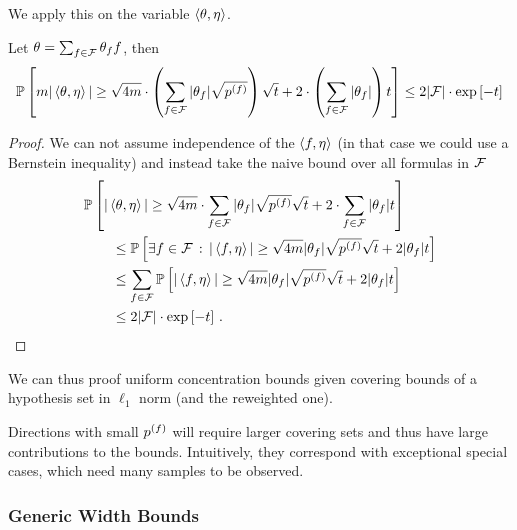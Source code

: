 We apply this on the variable  $\braket{\theta,\eta}$.

\begin{theorem}
	Let $\theta = \sum_{f\in\mathcal{F}} \theta_{f}f$, then
	\[ \mathbb{P}\left[m |\braket{\theta,\eta}|\geq \sqrt{4 m} \cdot \left( \sum_{f\in\mathcal{F}} |\theta_{f}| \sqrt{p^{(f)}} \right) \sqrt{t}  + 2 \cdot \left( \sum_{f\in\mathcal{F}} |\theta_{f}|  \right) t \right] \leq 2|\mathcal{F} | \cdot \mathrm{exp}\left[- t\right] \]
\end{theorem}
\begin{proof}
	We can not assume independence of the $\braket{f,\eta}$ (in that case we could use a Bernstein inequality) and instead take the naive bound over all formulas in $\mathcal{F}$ 
	\begin{align}
		& \mathbb{P}\left[|\braket{\theta,\eta}|\geq
		 \sqrt{4 m} \cdot \sum_{f\in\mathcal{F}} |\theta_{f}| \sqrt{p^{(f)}}\sqrt{t}  
		 + 2 \cdot \sum_{f\in\mathcal{F}} |\theta_{f}|  t \right] \\
		& \quad \quad \leq \mathbb{P}\left[\exists f\in\mathcal{F} \, : \, |\braket{f,\eta}|\geq  \sqrt{4 m}  |\theta_{f}| \sqrt{p^{(f)}}\sqrt{t}  + 2 |\theta_{f}|  t  \right]\\
		& \quad \quad \leq \sum_{f\in\mathcal{F}} \mathbb{P}\left[ |\braket{f,\eta}|\geq  \sqrt{4 m}  |\theta_{f}| \sqrt{p^{(f)}}\sqrt{t}  + 2 |\theta_{f}|  t  \right]\\
		& \quad \quad  \leq 2|\mathcal{F}| \cdot  \mathrm{exp}\left[-t\right] \, .
	\end{align}
\end{proof}

We can thus proof uniform concentration bounds given covering bounds of a hypothesis set in $\ell_1$ norm (and the reweighted one).

\begin{remark}	
	Directions with small $p^{(f)}$ will require larger covering sets and thus have large contributions to the bounds.
	Intuitively, they correspond with exceptional special cases, which need many samples to be observed. 
\end{remark}


\subsubsection{Generic Width Bounds}

